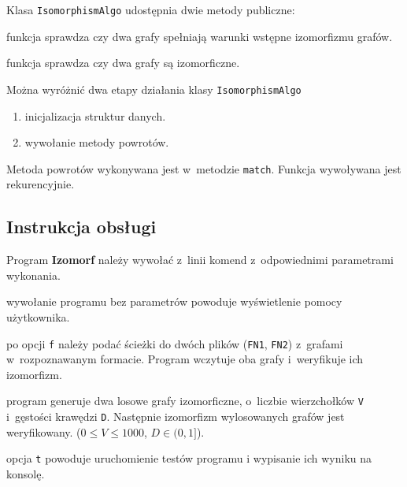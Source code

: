 \documentclass[12pt, a4paper, ]{article} %
\begin{document}
\vspace{2 em}

Klasa \texttt{IsomorphismAlgo} udostępnia dwie metody publiczne:
\begin{description}[leftmargin=!,labelwidth=\widthof{\bfseries meetsRequirements}]
  \item [\texttt{meetsRequirements}] funkcja sprawdza czy dwa grafy spełniają warunki
    wstępne izomorfizmu grafów.
  \item [\texttt{isIsomorphism}] funkcja sprawdza czy dwa grafy są izomorficzne.
\end{description}

\vspace{2 em}

Można wyróżnić dwa etapy działania klasy \texttt{IsomorphismAlgo}
\begin{enumerate}
    \item inicjalizacja struktur danych.
    \item wywołanie metody powrotów.
\end{enumerate}

Metoda powrotów wykonywana jest w~metodzie \texttt{match}. Funkcja wywoływana jest rekurencyjnie.


\subsection{Instrukcja obsługi}
Program \textbf{Izomorf} należy wywołać z~linii komend z~odpowiednimi parametrami wykonania.
\begin{description}[leftmargin=!,labelwidth=\widthof{\bfseries f FN1 FN2}]
  \item [\texttt{<brak>}] wywołanie programu bez parametrów powoduje
    wyświetlenie pomocy użytkownika.
  \item [\texttt{f FN1 FN2}] po opcji \texttt{f} należy podać ścieżki do dwóch
    plików (\texttt{FN1}, \texttt{FN2}) z~grafami w~rozpoznawanym formacie.
    Program wczytuje oba grafy i~weryfikuje ich izomorfizm.
  \item [\texttt{r V D}] program generuje dwa losowe grafy izomorficzne, o~liczbie
    wierzchołków \texttt{V} i~gęstości krawędzi \texttt{D}. Następnie izomorfizm
  wylosowanych grafów jest weryfikowany. ($0 \leq V \leq 1000$, $D \in (0, 1]$).
  \item [\texttt{t}] opcja \texttt{t} powoduje uruchomienie testów programu i
    wypisanie ich wyniku na konsolę.
\end{description}
\end{document}
